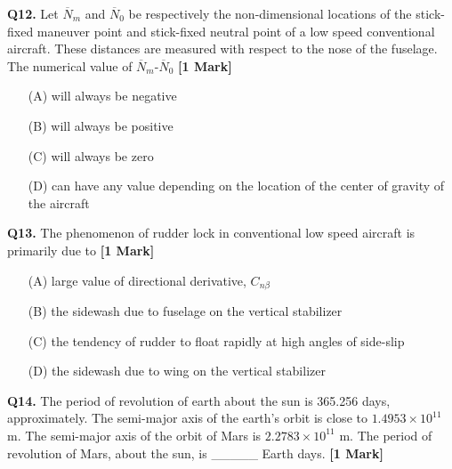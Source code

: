 \documentclass[11pt]{article}
\newcommand{\questiona}[2]{
    \noindent\textbf{Q#2.} #1 \hfill \textbf{[1 Mark]}
}
\begin{document}
\vspace{0.5cm}

\questiona{Let $\overline{N}_m$ and $\overline{N}_0$ be respectively the non-dimensional locations of the stick-fixed maneuver point and stick-fixed neutral point of a low speed conventional aircraft. These distances are measured with respect to the nose of the fuselage. The numerical value of $\overline{N}_m$-$\overline{N}_0$}{12}
\begin{enumerate}
    \item[(A)] will always be negative  
    \item[(B)] will always be positive  
    \item[(C)] will always be zero  
    \item[(D)] can have any value depending on the location of the center of gravity of the aircraft
\end{enumerate}

\vspace{0.5cm}

\questiona{The phenomenon of rudder lock in conventional low speed aircraft is primarily due to}{13}
\begin{enumerate}
    \item[(A)] large value of directional derivative, $C_{n\beta}$  
    \item[(B)] the sidewash due to fuselage on the vertical stabilizer  
    \item[(C)] the tendency of rudder to float rapidly at high angles of side-slip  
    \item[(D)] the sidewash due to wing on the vertical stabilizer
\end{enumerate}

\vspace{0.5cm}

\questiona{The period of revolution of earth about the sun is 365.256 days, approximately. The semi-major axis of the earth's orbit is close to $1.4953 \times 10^{11}$ m. The semi-major axis of the orbit of Mars is $2.2783 \times 10^{11}$ m. The period of revolution of Mars, about the sun, is \_\_\_\_\_ Earth days.}{14}

\vspace{0.5cm}
\end{document}
